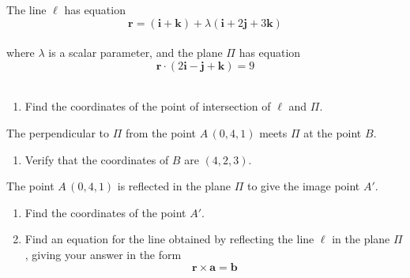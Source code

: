 \documentclass[leqno]{article}
\begin{document}
\begin{enumerate}[
  label=\textbf{\arabic*.},
  leftmargin=*,
  topsep=0pt,
  partopsep=0pt,
  parsep=0pt
]
The line $\ell$ has equation
\[
\mathbf{r}=(\mathbf{i}+\mathbf{k})+\lambda(\mathbf{i}+2\mathbf{j}+3\mathbf{k})
\] \\
where $\lambda$ is a scalar parameter, and the plane $\Pi$ has equation
\[
\mathbf{r}\cdot(2\mathbf{i}-\mathbf{j}+\mathbf{k})=9
\] \\
\begin{enumerate}[label=\textbf{(\alph*)}]
  \item Find the coordinates of the point of intersection of $\ell$ and $\Pi$.  \\
\end{enumerate}
The perpendicular to $\Pi$ from the point $A\,(0,4,1)$ meets $\Pi$ at the point $B$. \\
\begin{enumerate}[label=\textbf{(\alph*)}, resume]
  \item Verify that the coordinates of $B$ are $(4,2,3)$.  \\
\end{enumerate}
The point $A\,(0,4,1)$ is reflected in the plane $\Pi$ to give the image point $A'$. \\
\begin{enumerate}[label=\textbf{(\alph*)}, resume]
  \item Find the coordinates of the point $A'$.  \\
  \item Find an equation for the line obtained by reflecting the line $\ell$ in the plane $\Pi$, giving your answer in the form
  \[
  \mathbf{r}\times\mathbf{a}=\mathbf{b}
  \]
\end{enumerate}


\end{enumerate}
\end{document}
